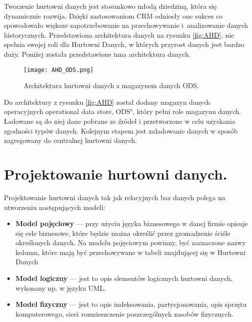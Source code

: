  
Tworzenie hurtowni danych jest stosunkowo młodą dziedziną, która się dynamicznie rozwija.
Dzięki zastosowaniom CRM odniosły one sukces co spowodowało większe zapotrzebowanie na przechowywanie
 i~analizowanie danych historycznych. Przedstawiona architektura danych na rysunku \ref{fig:AHD}, 
 nie spełnia swojej roli dla Hurtowni Danych, w których przyrost  danych jest bardzo duży.\cite{link_hd}
Poniżej została przedstawione inna architektura danych.
\begin{center}
\begin{figure}[H]
  \begin{center}
    \texttt{[image: AHD\_ODS.png]}
  \end{center}
  \caption{Architektura hurtowni danych z magazynem danych ODS. }
    \label{fig:ODS}
\end{figure}
\end{center}

Do architektury z rysunku \ref{fig:AHD} został dodany magazyn danych operacyjnych \ang{operational data store, ODS}, który
pełni role magazynu danych. Ładowane są do niej dane pobrane ze źródeł i przetworzone w celu uzyskania zgodności typów danych.
Kolejnym etapem jest załadowanie danych w sposób zagregowany do centralnej hurtowni danych.


\section{Projektowanie hurtowni danych.}
Projektowanie hurtowni danych tak jak relacyjnych baz danych polega na utworzeniu następujących modeli\cite{TodMan}:

\begin{itemize}
 \item \textbf{Model pojęciowy} --- 
    przy użyciu języka biznesowego w danej firmie opisuje się cele biznesowe, 
    które będzie można określić przez gromadzenie ściśle określonych danych.
   Na modelu pojęciowym powinny, być zaznaczone nazwy kolumn, które mają być przechowywane 
    w tabeli znajdującej się w Hurtowni Danych
 \item \textbf{Model logiczny} --- 
    jest to opis elementów  logicznych hurtowni danych, wykonany np. w języku UML.
 \item \textbf{Model fizyczny} --- 
    jest to opis indeksowania, partycjonowania, opis sprzętu komputerowego, sieci
     rozmieszczenie poszczególnych zasobów fizycznych.
\end{itemize}

